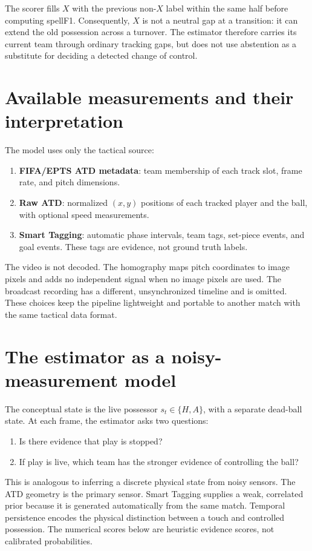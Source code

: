 \documentclass[11pt,a4paper]{article}
\begin{document}
The scorer fills $X$ with the previous non-$X$ label within the same half before computing spellF1.
Consequently, $X$ is not a neutral gap at a transition: it can extend the old possession across a
turnover. The estimator therefore carries its current team through ordinary tracking gaps, but
does not use abstention as a substitute for deciding a detected change of control.

\section{Available measurements and their interpretation}

The model uses only the tactical source:
\begin{enumerate}[leftmargin=*]
  \item \textbf{FIFA/EPTS ATD metadata}: team membership of each track slot, frame rate, and pitch
        dimensions.
  \item \textbf{Raw ATD}: normalized $(x,y)$ positions of each tracked player and the ball, with
        optional speed measurements.
  \item \textbf{Smart Tagging}: automatic phase intervals, team tags, set-piece events, and goal
        events. These tags are evidence, not ground truth labels.
\end{enumerate}

The video is not decoded. The homography maps pitch coordinates to image pixels and adds no
independent signal when no image pixels are used. The broadcast recording has a different,
unsynchronized timeline and is omitted. These choices keep the pipeline lightweight and portable
to another match with the same tactical data format.

\section{The estimator as a noisy-measurement model}

The conceptual state is the live possessor $s_t\in\{H,A\}$, with a separate dead-ball state. At each
frame, the estimator asks two questions:
\begin{enumerate}[leftmargin=*]
  \item Is there evidence that play is stopped?
  \item If play is live, which team has the stronger evidence of controlling the ball?
\end{enumerate}

This is analogous to inferring a discrete physical state from noisy sensors. The ATD geometry is the
primary sensor. Smart Tagging supplies a weak, correlated prior because it is generated
automatically from the same match. Temporal persistence encodes the physical distinction between a
touch and controlled possession. The numerical scores below are heuristic evidence scores, not
calibrated probabilities.
\end{document}
